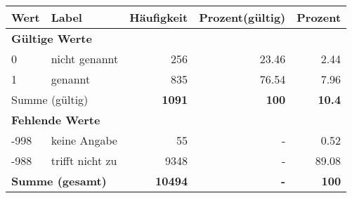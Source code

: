      \begin{longtable}{lXrrr}
     \toprule
     \textbf{Wert} & \textbf{Label} & \textbf{Häufigkeit} & \textbf{Prozent(gültig)} & \textbf{Prozent} \\
     \endhead
     \midrule
     \multicolumn{5}{l}{\textbf{Gültige Werte}}\\

     0 &
     \multicolumn{1}{X}{ nicht genannt   } &


       \num{256} &
       \num[round-mode=places,round-precision=2]{23.46} &
         \num[round-mode=places,round-precision=2]{2.44} \\

     1 &
     \multicolumn{1}{X}{ genannt   } &


       \num{835} &
       \num[round-mode=places,round-precision=2]{76.54} &
         \num[round-mode=places,round-precision=2]{7.96} \\
     \midrule
     \multicolumn{2}{l}{Summe (gültig)} &
       \textbf{\num{1091}} &
     \textbf{\num{100}} &
       \textbf{\num[round-mode=places,round-precision=2]{10.4}} \\
     \multicolumn{5}{l}{\textbf{Fehlende Werte}}\\
       -998 &
       keine Angabe &
         \num{55} &
        - &
         \num[round-mode=places,round-precision=2]{0.52} \\
       -988 &
       trifft nicht zu &
         \num{9348} &
        - &
         \num[round-mode=places,round-precision=2]{89.08} \\
     \midrule
     \multicolumn{2}{l}{\textbf{Summe (gesamt)}} &
          \textbf{\num{10494}} &
        \textbf{-} &
        \textbf{\num{100}} \\
     \bottomrule
     \end{longtable}
     
